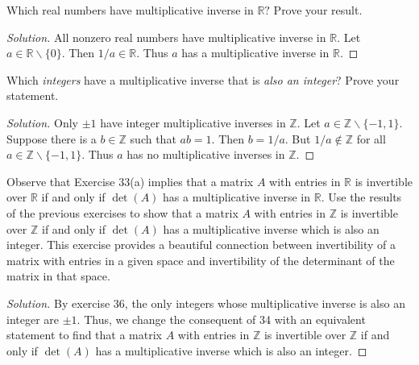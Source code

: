 \documentclass[12pt]{article}
\newcommand{\Z}{\mathbb{Z}}
\newcommand{\R}{\mathbb{R}}
\newenvironment{exercise}[2][Exercise]{\begin{trivlist}
        \item[\hskip \labelsep {\bfseries #1}\hskip \labelsep {\bfseries #2.}]}{\end{trivlist}}
\newenvironment{solution}
        {\begin{proof}[Solution]}
                    {\end{proof}}
\begin{document}
\begin{exercise}{35}
    Which real numbers have multiplicative inverse in \( \R? \) Prove your result.
    \begin{solution}
        All nonzero real numbers have multiplicative inverse in \( \R. \) Let \( a \in \R \backslash \{0\} \). Then \( 1/a \in \R. \) Thus \( a \) has a multiplicative inverse in \( \R. \)
    \end{solution}
\end{exercise}

\begin{exercise}{36}
    Which \textit{integers} have a multiplicative inverse that is \textit{also an integer}? Prove your statement.
    \begin{solution}
        Only \( \pm 1 \) have integer multiplicative inverses in \( \Z. \) Let \( a \in \Z \backslash \{-1,1\} \). Suppose there is a \( b \in \Z \) such that \( ab = 1. \) Then \( b = 1/a. \) But \( 1/a \notin \Z \) for all \( a \in \Z\backslash \{ -1,1 \} . \) Thus \( a \) has no multiplicative inverses in \( \Z. \)
    \end{solution}
\end{exercise}

\begin{exercise}{37}
    Observe that Exercise \( 33 \)(a) implies that a matrix \( A \) with entries in \( \R \) is invertible over \( \R \) if and only if \( \det(A) \) has a multiplicative inverse in \( \R. \) Use the results of the previous exercises to show that a matrix \( A \) with entries in \( \Z \) is invertible over \( \Z \) if and only if \( \det(A) \) has a multiplicative inverse which is also an integer. This exercise provides a beautiful connection between invertibility of a matrix with entries in a given space and invertibility of the determinant of the matrix in that space.
    \begin{solution}
        By exercise 36, the only integers whose multiplicative inverse is also an integer are \( \pm1. \) Thus, we change the consequent of 34 with an equivalent statement to find that a matrix \( A \) with entries in \( \Z \) is invertible over \( \Z \) if and only if \( \det(A) \) has a multiplicative inverse which is also an integer.
    \end{solution}
\end{exercise}
\end{document}
